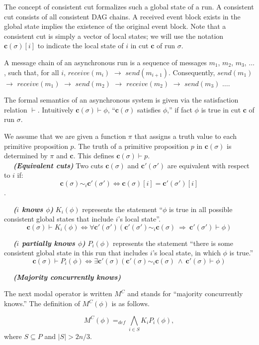 \documentclass{article}
\newcommand{\dfnn}[2]{$\quad$ \textbf{\emph{(#1)}} {#2}}
\renewcommand{\vec}[1]{\mathbf{#1}}
\begin{document}
The concept of consistent cut formalizes such a global state of a run. A consistent cut consists of all consistent DAG chains. A received event block exists in the global state implies the existence of the original event block. Note that a consistent cut is simply a vector of local states; we will use the notation $\vec{c}(\sigma)[i]$ to indicate the local state of $i$ in cut $\vec{c}$ of run $\sigma$.

A message chain of an asynchronous run is a sequence of messages $m_1$, $m_2$, $m_3$, $\dots$, such that, for all $i$, $receive(m_i)$ $\rightarrow$  $send(m_{i+1})$. Consequently, $send(m_1)$ $\rightarrow$ $receive(m_1)$ $\rightarrow$ $send(m_2)$ $\rightarrow$ $receive(m_2)$ $\rightarrow$ $send(m_3)$ $\dots$.

The formal semantics of an asynchronous system is given via  the satisfaction relation $\vdash$. Intuitively $\vec{c}(\sigma) \vdash \phi$, ``$\vec{c}(\sigma)$ satisfies $\phi$,'' if fact $\phi$ is true in cut $\vec{c}$ of run $\sigma$.

We assume that we are given a function $\pi$ that assigns a truth value to each primitive proposition $p$. The truth of a primitive proposition $p$ in $\vec{c}(\sigma)$ is determined by $\pi$ and $\vec{c}$. This defines $\vec{c}(\sigma) \vdash p$.\\

\dfnn{Equivalent cuts}{Two cuts $\vec{c}(\sigma)$ and $\vec{c'}(\sigma')$ are equivalent  with respect to $i$ if: $$\vec{c}(\sigma) \sim_i \vec{c'}(\sigma') \Leftrightarrow \vec{c}(\sigma)[i] = \vec{c'}(\sigma')[i]$$.}

\dfnn{$i$ knows $\phi$}{$K_i(\phi)$ represents the statement ``$\phi$ is true in all possible consistent global states that include $i$’s local state''. 
$$\vec{c}(\sigma) \vdash K_i(\phi) \Leftrightarrow \forall \vec{c'}(\sigma')   (\vec{c'}(\sigma') \sim_i \vec{c}(\sigma) \ \Rightarrow\ \vec{c'}(\sigma') \vdash \phi) $$}

\dfnn{$i$ partially knows $\phi$}{$P_i(\phi)$ represents the statement ``there is some consistent global state in this run that includes $i$’s local state, in which $\phi$ is true.''
$$\vec{c}(\sigma) \vdash P_i(\phi) \Leftrightarrow \exists \vec{c'}(\sigma) ( \vec{c'}(\sigma) \sim_i \vec{c}(\sigma) \ \wedge\ \vec{c'}(\sigma) \vdash \phi )$$}
		
\dfnn{Majority concurrently knows}{The next modal operator is written $M^C$ and stands for ``majority concurrently knows.''
The definition of $M^C(\phi)$ is as follows.

$$M^C(\phi) =_{def} \bigwedge_{i \in S} K_i P_i(\phi), $$ where $S \subseteq P$ and $|S| > 2n/3$.}
\end{document}
